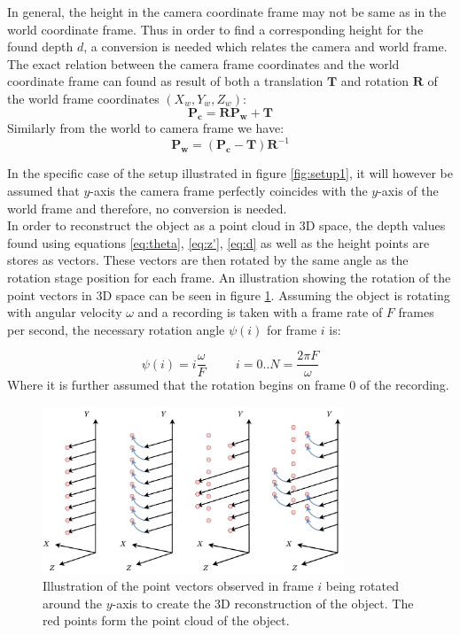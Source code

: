 In general, the height in the camera coordinate frame may not be same as in the world coordinate frame. Thus in order to find a corresponding height for the found depth $d$, a conversion is needed which relates the camera and world frame. The exact relation between the camera frame coordinates and the world coordinate frame can found as result of both a translation $\boldsymbol{T}$ and rotation $\boldsymbol{R}$ of the world frame coordinates $(X_{w}, Y_{w}, Z_{w})$:
\begin{equation}
    \boldsymbol{P_{c}} = \boldsymbol{R} \boldsymbol{P_{w}} + \boldsymbol{T}
\end{equation}
Similarly from the world to camera frame we have:
\begin{equation}
    \boldsymbol{P_{w}} = (\boldsymbol{P_{c}} - \boldsymbol{T})\boldsymbol{R}^{-1}
\end{equation}

In the specific case of the setup illustrated in figure \ref{fig:setup1}, it will however be assumed that $y$-axis the camera frame perfectly coincides with the $y$-axis of the world frame and therefore, no conversion is needed.\\  

In order to reconstruct the object as a point cloud in 3D space, the depth values found using equations \ref{eq:theta}, \ref{eq:z'}, \ref{eq:d} as well as the height points are stores as vectors. These vectors are then rotated by the same angle as the rotation stage position for each frame. An illustration showing the rotation of the point vectors in 3D space can be seen in figure \ref{fig:pointcloud}. Assuming the object is rotating with angular velocity $\omega$ and a recording is taken with a frame rate of $F$ frames per second, the necessary rotation angle $\psi(i)$ for frame $i$ is:

\begin{equation}
    \psi(i) = i\frac{\omega}{F} \hspace{1cm} i = 0..N=\frac{2\pi F}{\omega}
\end{equation}
Where it is further assumed that the rotation begins on frame 0 of the recording.

\begin{figure}[h]
    \centering
    \includegraphics[width=0.8\textwidth]{figures/reconstruction/pointcloud.pdf}
    \caption{Illustration of the point vectors observed in frame $i$ being rotated around the $y$-axis to create the 3D reconstruction of the object. The red points form the point cloud of the object.}
    \label{fig:pointcloud}
\end{figure}

